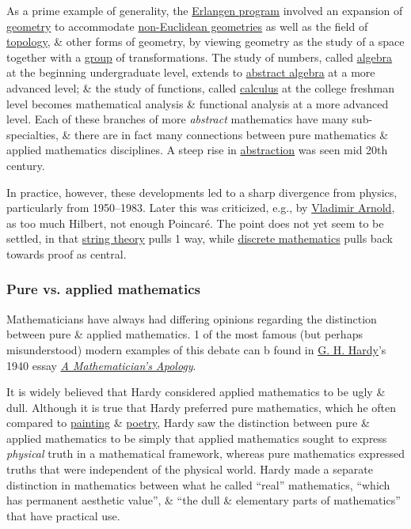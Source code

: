 \documentclass{article}
\begin{document}
As a prime example of generality, the \href{https://en.wikipedia.org/wiki/Erlangen_program}{Erlangen program} involved an expansion of \href{https://en.wikipedia.org/wiki/Geometry}{geometry} to accommodate \href{https://en.wikipedia.org/wiki/Non-Euclidean_geometries}{non-Euclidean geometries} as well as the field of \href{https://en.wikipedia.org/wiki/Topology}{topology}, \& other forms of geometry, by viewing geometry as the study of a space together with a \href{https://en.wikipedia.org/wiki/Group_(mathematics)}{group} of transformations. The study of numbers, called \href{https://en.wikipedia.org/wiki/Algebra}{algebra} at the beginning undergraduate level, extends to \href{https://en.wikipedia.org/wiki/Abstract_algebra}{abstract algebra} at a more advanced level; \& the study of functions, called \href{https://en.wikipedia.org/wiki/Calculus}{calculus} at the college freshman level becomes mathematical analysis \& functional analysis at a more advanced level. Each of these branches of more {\it abstract} mathematics have many sub-specialties, \& there are in fact many connections between pure mathematics \& applied mathematics disciplines. A steep rise in \href{https://en.wikipedia.org/wiki/Abstraction}{abstraction} was seen mid 20th century.

In practice, however, these developments led to a sharp divergence from physics, particularly from 1950--1983. Later this was criticized, e.g., by \href{https://en.wikipedia.org/wiki/Vladimir_Arnold}{\sc Vladimir Arnold}, as too much Hilbert, not enough Poincar\'e. The point does not yet seem to be settled, in that \href{https://en.wikipedia.org/wiki/String_theory}{string theory} pulls 1 way, while \href{https://en.wikipedia.org/wiki/Discrete_mathematics}{discrete mathematics} pulls back towards proof as central.

\subsubsection{Pure vs. applied mathematics}
Mathematicians have always had differing opinions regarding the distinction between pure \& applied mathematics. 1 of the most famous (but perhaps misunderstood) modern examples of this debate can b found in \href{https://en.wikipedia.org/wiki/G.H._Hardy}{\sc G. H. Hardy}'s 1940 essay \href{https://en.wikipedia.org/wiki/A_Mathematician%27s_Apology}{\it A Mathematician's Apology}.

It is widely believed that {\sc Hardy} considered applied mathematics to be ugly \& dull. Although it is true that {\sc Hardy} preferred pure mathematics, which he often compared to \href{https://en.wikipedia.org/wiki/Painting}{painting} \& \href{https://en.wikipedia.org/wiki/Poetry}{poetry}, {\sc Hardy} saw the distinction between pure \& applied mathematics to be simply that applied mathematics sought to express {\it physical} truth in a mathematical framework, whereas pure mathematics expressed truths that were independent of the physical world. {\sc Hardy} made a separate distinction in mathematics between what he called ``real'' mathematics, ``which has permanent aesthetic value'', \& ``the dull \& elementary parts of mathematics'' that have practical use.
\end{document}
